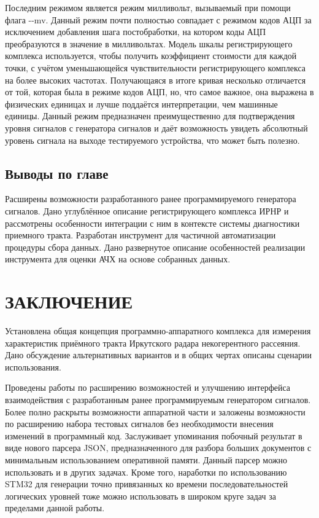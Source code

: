 \documentclass{report}
\begin{document}
Последним режимом является режим милливольт, вызываемый при помощи флага -{}-mv. Данный режим почти полностью совпадает с режимом кодов АЦП за исключением добавления шага постобработки, на котором коды АЦП преобразуются в значение в милливольтах. Модель шкалы регистрирующего комплекса используется, чтобы получить коэффициент стоимости для каждой точки, с учётом уменьшающейся чувствительности регистрирующего комплекса на более высоких частотах. Получающаяся в итоге кривая несколько отличается от той, которая была в режиме кодов АЦП, но, что самое важное, она выражена в физических единицах и лучше поддаётся интерпретации, чем машинные единицы. Данный режим предназначен преимущественно для подтверждения уровня сигналов с генератора сигналов и даёт возможность увидеть абсолютный уровень сигнала на выходе тестируемого устройства, что может быть полезно.

\section*{Выводы по главе}
Расширены возможности разработанного ранее программируемого генератора сигналов. Дано углублённое описание регистрирующего комплекса ИРНР и рассмотрены особенности интеграции с ним в контексте системы диагностики приемного тракта. Разработан инструмент для частичной автоматизации процедуры сбора данных. Дано развернутое описание особенностей реализации инструмента для оценки АЧХ на основе собранных данных.

\chapter*{ЗАКЛЮЧЕНИЕ}

Установлена общая концепция программно-аппаратного комплекса для измерения характеристик приёмного тракта Иркутского радара некогерентного рассеяния. Дано обсуждение альтернативных вариантов и в общих чертах описаны сценарии использования.

Проведены работы по расширению возможностей и улучшению интерфейса взаимодействия с разработанным ранее программируемым генератором сигналов. Более полно раскрыты возможности аппаратной части и заложены возможности по расширению набора тестовых сигналов без необходимости внесения изменений в программный код. Заслуживает упоминания побочный результат в виде нового парсера JSON, предназначенного для разбора больших документов с минимальным использованием оперативной памяти. Данный парсер можно использовать и в других задачах. Кроме того, наработки по использованию STM32 для генерации точно привязанных ко времени последовательностей логических уровней тоже можно использовать в широком круге задач за пределами данной работы.
\end{document}
